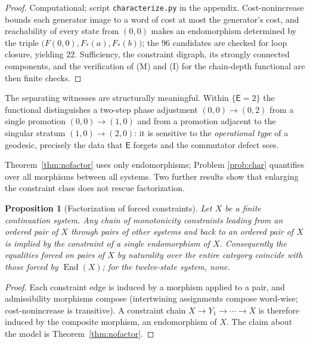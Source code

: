 \documentclass[11pt]{article}
\newtheorem{proposition}[theorem]{Proposition}
\theoremstyle{remark}
\newcommand{\E}{\mathsf{E}}
\begin{document}
\begin{proof}
Computational; script \texttt{characterize.py} in the appendix.
Cost-nonincrease bounds each generator image to a word of cost at
most the generator's cost, and reachability of every state from
$(0,0)$ makes an endomorphism determined by the triple
$\bigl(F(0,0),F_{*}(a),F_{*}(b)\bigr)$; the $96$ candidates are
checked for loop closure, yielding $22$. Sufficiency, the constraint
digraph, its strongly connected components, and the verification of
(M) and (I) for the chain-depth functional are then finite checks.
\end{proof}

The separating witnesses are structurally meaningful. Within
$\{\E=2\}$ the functional distinguishes a two-step phase adjustment
$(0,0)\to(0,2)$ from a single promotion $(0,0)\to(1,0)$ and from a
promotion adjacent to the singular stratum $(1,0)\to(2,0)$: it is
sensitive to the \emph{operational type} of a geodesic, precisely the
data that $\E$ forgets and the commutator defect sees.

Theorem~\ref{thm:nofactor} uses only endomorphisms; Problem
\ref{prob:char} quantifies over all morphisms between all systems. Two
further results show that enlarging the constraint class does not
rescue factorization.

\begin{proposition}[Factorization of forced constraints]
\label{prop:factor}
Let $X$ be a finite continuation system. Any chain of monotonicity
constraints leading from an ordered pair of $X$ through pairs of other
systems and back to an ordered pair of $X$ is implied by the
constraint of a single endomorphism of $X$. Consequently the
equalities forced on pairs of $X$ by naturality over the entire
category coincide with those forced by $\operatorname{End}(X)$; for
the twelve-state system, none.
\end{proposition}

\begin{proof}
Each constraint edge is induced by a morphism applied to a pair, and
admissibility morphisms compose (intertwining assignments compose
word-wise; cost-nonincrease is transitive). A constraint chain
$X \to Y_1 \to \cdots \to X$ is therefore induced by the composite
morphism, an endomorphism of $X$. The claim about the model is
Theorem~\ref{thm:nofactor}.
\end{proof}
\end{document}

